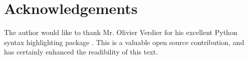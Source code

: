 \chapter*{Acknowledgements}
\label{chap:Acknowledgements}

The author would like to thank Mr. Olivier Verdier for his excellent Python syntax highlighting package \cite{Verdier}. This is a valuable open source contribution, and has certainly enhanced the readibility of this text.
